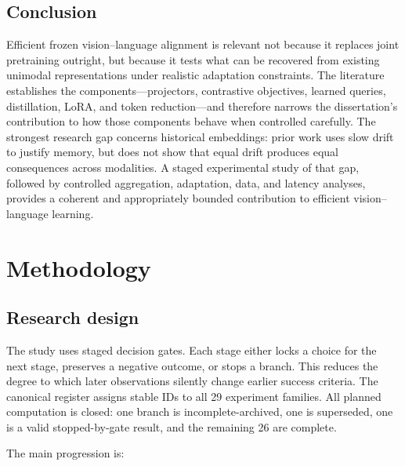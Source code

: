 \documentclass[11pt,a4paper,oneside]{report}
\begin{document}
\section{Conclusion}

Efficient frozen vision--language alignment is relevant not because it replaces
joint pretraining outright, but because it tests what can be recovered from
existing unimodal representations under realistic adaptation constraints. The
literature establishes the components---projectors, contrastive objectives,
learned queries, distillation, LoRA, and token reduction---and therefore narrows
the dissertation's contribution to how those components behave when controlled
carefully. The strongest research gap concerns historical embeddings: prior work
uses slow drift to justify memory, but does not show that equal drift produces
equal consequences across modalities. A staged experimental study of that gap,
followed by controlled aggregation, adaptation, data, and latency analyses,
provides a coherent and appropriately bounded contribution to efficient
vision--language learning.

\chapter{Methodology}
\section{Research design}
The study uses staged decision gates. Each stage either locks a choice for the next stage, preserves a negative outcome, or stops a branch. This reduces the degree to which later observations silently change earlier success criteria. The canonical register assigns stable IDs to all 29 experiment families. All planned computation is closed: one branch is incomplete-archived, one is superseded, one is a valid stopped-by-gate result, and the remaining 26 are complete.

The main progression is:
\end{document}
